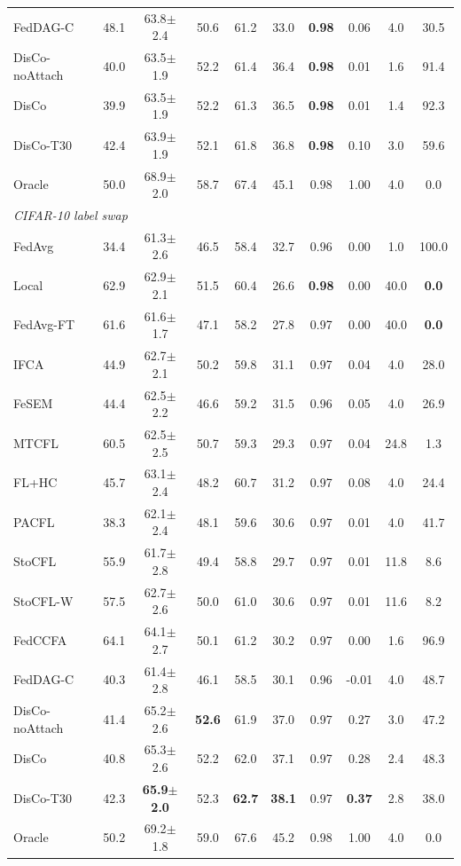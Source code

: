\begin{tabular}{lccccccccc}
FedDAG-C & 48.1 & 63.8$\pm$2.4 & 50.6 & 61.2 & 33.0 & \textbf{0.98} & 0.06 & 4.0 & 30.5 \\
DisCo-noAttach & 40.0 & 63.5$\pm$1.9 & 52.2 & 61.4 & 36.4 & \textbf{0.98} & 0.01 & 1.6 & 91.4 \\
DisCo & 39.9 & 63.5$\pm$1.9 & 52.2 & 61.3 & 36.5 & \textbf{0.98} & 0.01 & 1.4 & 92.3 \\
DisCo-T30 & 42.4 & 63.9$\pm$1.9 & 52.1 & 61.8 & 36.8 & \textbf{0.98} & 0.10 & 3.0 & 59.6 \\
Oracle & 50.0 & 68.9$\pm$2.0 & 58.7 & 67.4 & 45.1 & 0.98 & 1.00 & 4.0 & 0.0 \\
\midrule
\multicolumn{10}{l}{\textit{CIFAR-10 label swap}}\\
FedAvg & 34.4 & 61.3$\pm$2.6 & 46.5 & 58.4 & 32.7 & 0.96 & 0.00 & 1.0 & 100.0 \\
Local & 62.9 & 62.9$\pm$2.1 & 51.5 & 60.4 & 26.6 & \textbf{0.98} & 0.00 & 40.0 & \textbf{0.0} \\
FedAvg-FT & 61.6 & 61.6$\pm$1.7 & 47.1 & 58.2 & 27.8 & 0.97 & 0.00 & 40.0 & \textbf{0.0} \\
IFCA & 44.9 & 62.7$\pm$2.1 & 50.2 & 59.8 & 31.1 & 0.97 & 0.04 & 4.0 & 28.0 \\
FeSEM & 44.4 & 62.5$\pm$2.2 & 46.6 & 59.2 & 31.5 & 0.96 & 0.05 & 4.0 & 26.9 \\
MTCFL & 60.5 & 62.5$\pm$2.5 & 50.7 & 59.3 & 29.3 & 0.97 & 0.04 & 24.8 & 1.3 \\
FL+HC & 45.7 & 63.1$\pm$2.4 & 48.2 & 60.7 & 31.2 & 0.97 & 0.08 & 4.0 & 24.4 \\
PACFL & 38.3 & 62.1$\pm$2.4 & 48.1 & 59.6 & 30.6 & 0.97 & 0.01 & 4.0 & 41.7 \\
StoCFL & 55.9 & 61.7$\pm$2.8 & 49.4 & 58.8 & 29.7 & 0.97 & 0.01 & 11.8 & 8.6 \\
StoCFL-W & 57.5 & 62.7$\pm$2.6 & 50.0 & 61.0 & 30.6 & 0.97 & 0.01 & 11.6 & 8.2 \\
FedCCFA & 64.1 & 64.1$\pm$2.7 & 50.1 & 61.2 & 30.2 & 0.97 & 0.00 & 1.6 & 96.9 \\
FedDAG-C & 40.3 & 61.4$\pm$2.8 & 46.1 & 58.5 & 30.1 & 0.96 & -0.01 & 4.0 & 48.7 \\
DisCo-noAttach & 41.4 & 65.2$\pm$2.6 & \textbf{52.6} & 61.9 & 37.0 & 0.97 & 0.27 & 3.0 & 47.2 \\
DisCo & 40.8 & 65.3$\pm$2.6 & 52.2 & 62.0 & 37.1 & 0.97 & 0.28 & 2.4 & 48.3 \\
DisCo-T30 & 42.3 & \textbf{65.9$\pm$2.0} & 52.3 & \textbf{62.7} & \textbf{38.1} & 0.97 & \textbf{0.37} & 2.8 & 38.0 \\
Oracle & 50.2 & 69.2$\pm$1.8 & 59.0 & 67.6 & 45.2 & 0.98 & 1.00 & 4.0 & 0.0 \\
\bottomrule
\end{tabular}
